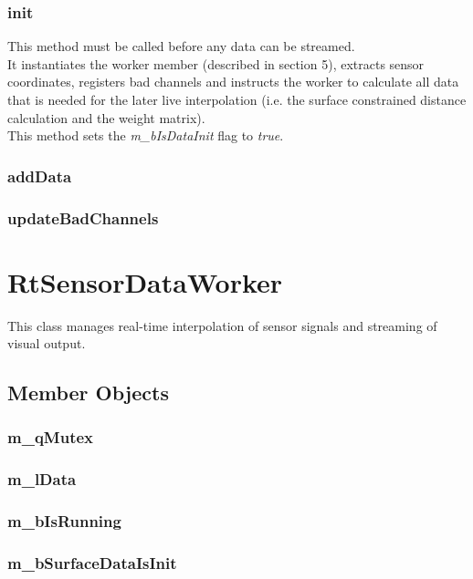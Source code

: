 \subsubsection{init}

This method must be called before any data can be streamed.\\
It instantiates the worker member (described in section 5), extracts sensor coordinates, registers bad channels and instructs the worker to calculate all data that is needed for the later live interpolation (i.e. the surface constrained distance calculation and the weight matrix).\\
This method sets the \textit{m\_bIsDataInit} flag to \textit{true}.

\subsubsection{addData}

\subsubsection{updateBadChannels}

\clearpage

\section{RtSensorDataWorker}

This class manages real-time interpolation of sensor signals and streaming of visual output.

\subsection{Member Objects}

\subsubsection{m\_qMutex}

\subsubsection{m\_lData}

\subsubsection{m\_bIsRunning}

\subsubsection{m\_bSurfaceDataIsInit}

